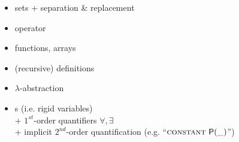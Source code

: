 {

\begin{itemize}
  \item sets + separation \& replacement
  \item {} operator
  \item functions, arrays
  \item (recursive) definitions
  \item $\lambda$-abstraction

  \item {}s (i.e. rigid variables)\\
    \hspace{20pt} +  $1^{st}$-order quantifiers $\forall, \exists$\\
    \hspace{20pt} + implicit $2^{nd}$-order quantification {\color{ForestGreen}(e.g. ``$\mathsf{ \textsc{constant}\ P(\_)}$'')}
\end{itemize}
\vspace{-15pt}

\vspace{34pt}
}


